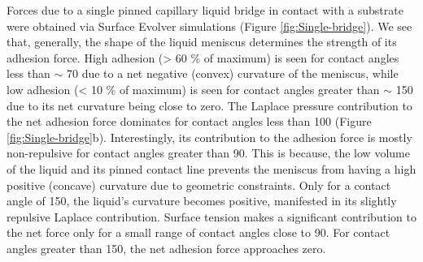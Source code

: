 \documentclass[vruler,JEB]{COB}%
\begin{document}
Forces due to a single pinned capillary liquid bridge in contact with
a substrate were obtained via Surface Evolver simulations (Figure \ref{fig:Single-bridge}).
We see that, generally, the shape of the liquid meniscus determines
the strength of its adhesion force. High adhesion (> 60 \% of maximum) is seen for contact
angles less than $\sim$ 70\textdegree{} due to a net negative (convex) curvature
of the meniscus, while low adhesion (< 10 \% of maximum) is seen for contact angles greater
than $\sim$ 150\textdegree{} due to its net curvature being close
to zero. The Laplace pressure contribution to the net adhesion force
dominates for contact angles less than 100\textdegree{} (Figure \ref{fig:Single-bridge}b).
Interestingly, its contribution to the adhesion force is mostly non-repulsive
for contact angles greater than 90\textdegree . This is because, the
low volume of the liquid and its pinned contact line prevents the
meniscus from having a high positive (concave) curvature due to geometric constraints.
Only for a contact angle of 150\textdegree , the liquid's curvature
becomes positive, manifested in its slightly repulsive Laplace contribution.
Surface tension makes a significant contribution to the net force
only for a small range of contact angles close to 90\textdegree .
For contact angles greater than 150\textdegree , the net adhesion
force approaches zero.


%
%
\end{document}
